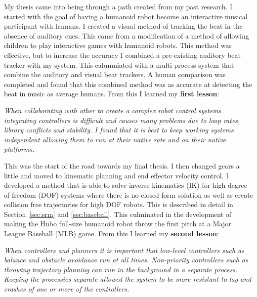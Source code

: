 My thesis came into being through a path created from my past research.
I started with the goal of having a humanoid robot become an interactive musical participant with humans.
I created a visual method of tracking the beat in the absence of auditory cues\cite{5686847}.
This came from a modification of a method of allowing children to play interactive games with humanoid robots\cite{lofaroGamesRobot}.
This method was effective, but to increase the accuracy I combined a pre-existing auditory beat tracker with my system.
This calumniated with a multi process system that combine the auditory and visual beat trackers\cite{lofaroIASTED2011,6094987,lofaroEURASIP2011}.
A human comparison was completed and found that this combined method was as accurate at detecting the beat in music as average humans.
From this I learned my \textbf{first lesson}:
\begin{adjustwidth}{2cm}{} \small
\noindent \textit{When collaborating with other to create a complex robot control systems integrating controllers is difficult and causes many problems due to loop rates, library conflicts and stability.
I found that it is best to keep working systems independent allowing them to run at their native rate and on their native platforms.}
\end{adjustwidth} \normalsize
\noindent This was the start of the road towards my final thesis.
I then changed gears a little and moved to kinematic planning and end effector velocity control. 
I developed a method that is able to solve inverse kinematics (IK) for high degree of freedom (DOF) systems where there is no closed-form solution as well as create collision free trajectories for high DOF robots\cite{6385987}.
This is described in detail in Section~\ref{sec:srm} and \ref{sec:baseball}.
This culminated in the development of making the Hubo full-size humanoid robot throw the first pitch at a Major League Baseball (MLB) game\cite{lofaroHumanoids2012,6462956}.
From this I learned my \textbf{second lesson}:
\begin{adjustwidth}{2cm}{} \small
\noindent \textit{When controllers and planners it is important that low-level controllers such as balance and obstacle avoidance run at all times. 
Non-priority controllers such as throwing trajectory planning can run in the background in a separate process.
Keeping the processies separate allowed the system to be more resistant to lag and crashes of one or more of the controllers. }
\end{adjustwidth} \normalsize
